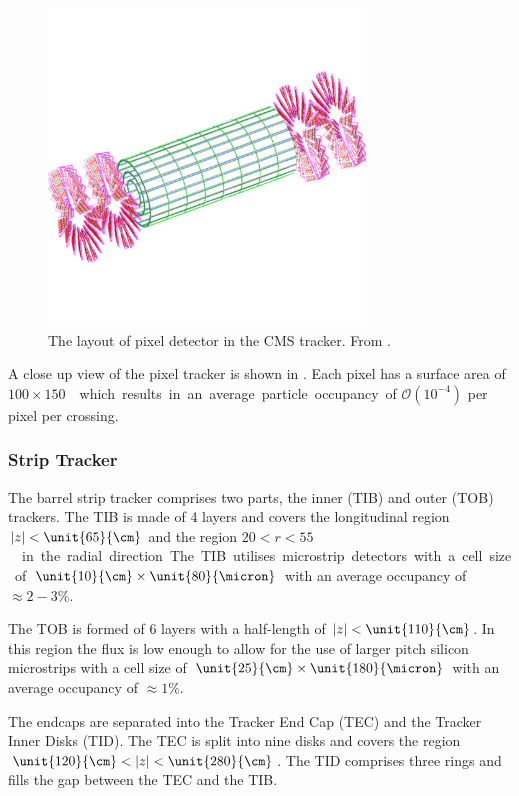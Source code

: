 \begin{figure}[htbp]
  \centering
  \includegraphics[width=0.75\textwidth]{pixel}
  \caption[The layout of pixel detector in the CMS tracker.]
  {The layout of pixel detector in the CMS tracker. From \cite{chatrchyan2008cms}.}
  \label{fig:pixel}
\end{figure}

A close up view of the pixel tracker is shown in .  
Each pixel has a surface area of \unit{$100\times150$}{\micron} which results in
an average particle occupancy of $\mathcal{O}(10^{-4})$ per pixel per crossing.

\subsubsection{Strip Tracker}
The barrel strip tracker comprises two parts, the inner (TIB) and outer (TOB)
trackers.  The TIB is made of 4 layers and covers the longitudinal region $|z|
< \unit{65}{\cm}$ and the region \unit{$20<r<55$}{\cm} in the radial direction.
The TIB utilises microstrip detectors with a cell size of
$\unit{10}{\cm}\times\unit{80}{\micron}$ with an average occupancy of
$\approx\unit{2-3}{\%}$.

The TOB is formed of 6 layers with a half-length of $|z| < \unit{110}{\cm}$. In
this region the flux is low enough to allow for the use of larger pitch
silicon microstrips with a cell size of
$\unit{25}{\cm}\times\unit{180}{\micron}$ with an average occupancy of
$\approx\unit{1}{\%}$.

The endcaps are separated into the Tracker End Cap (TEC) and the Tracker Inner
Disks (TID). The TEC is split into nine disks and covers the region
$\unit{120}{\cm} < |z| < \unit{280}{\cm}$. The TID comprises three rings
and fills the gap between the TEC and the TIB.

